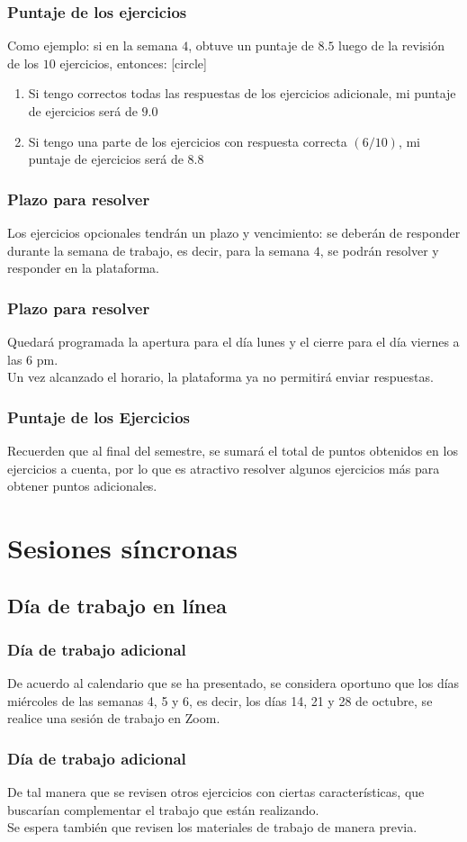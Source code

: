 \begin{frame}
\frametitle{Puntaje de los ejercicios}
Como ejemplo: si en la semana $4$, obtuve un puntaje de $8.5$ luego de la revisión de los $10$ ejercicios, entonces:
[circle]
\begin{enumerate}[<+->]
\item Si tengo correctos todas las respuestas de los ejercicios adicionale, mi puntaje de ejercicios  será de $9.0$
\item Si tengo una parte de los ejercicios con respuesta correcta $(6/10)$, mi puntaje de ejercicios será de $8.8$
\end{enumerate}
\end{frame}
\begin{frame}
\frametitle{Plazo para resolver}
Los ejercicios opcionales tendrán un plazo y vencimiento: se deberán de responder durante la semana de trabajo, es decir, para la semana $4$, se podrán resolver y responder en la plataforma.
\end{frame}
\begin{frame}
\frametitle{Plazo para resolver}
Quedará programada la apertura para el día lunes y el cierre para el día viernes a las 6 pm.
\\
\bigskip
Un vez alcanzado el horario, la plataforma ya no permitirá enviar respuestas.
\end{frame}
\begin{frame}
\frametitle{Puntaje de los Ejercicios}
Recuerden que al final del semestre, se sumará el total de puntos obtenidos en los ejercicios a cuenta, por lo que es atractivo resolver algunos ejercicios más para obtener puntos adicionales.
\end{frame}
\section{Sesiones síncronas}
\subsection{Día de trabajo en línea}
\begin{frame}
\frametitle{Día de trabajo adicional}
De acuerdo al calendario que se ha presentado, se considera oportuno que los días miércoles de las semanas 4, 5 y 6, es decir, los días 14, 21 y 28 de octubre, se realice una sesión de trabajo en Zoom.
\end{frame}
\begin{frame}
\frametitle{Día de trabajo adicional}
De tal manera que se revisen otros ejercicios con ciertas características, que buscarían complementar el trabajo que están realizando.
\\
\bigskip
Se espera también que revisen los materiales de trabajo de manera previa.
\end{frame}
